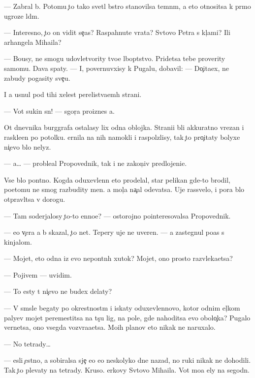 \documentclass[10pt]{book}
\begin{document}
— Zabral b{\yi}. Potomu {\c}to tako{\y} svetl{\yi}{\y} b{\yi}stro stanovilsa temn{\yi}m, a eto otnositsa k pr{\ia}mo{\y} ugroze l{\iu}d{\ia}m.

— Interesno, {\c}to on vidit se{\y}{\c}as? Raspahnut{\yi}{\y}e vrata? Sv{\ia}tovo Petra s kl{\iu}{\c}ami? Ili arhangela Miha{\y}ila?

— Bo{\y}usy, ne smogu udovletvority tvo{\y}e l{\iu}bop{\yi}tstvo. Pridetsa tebe proverity samomu. Dava{\y} spaty. — I, povernuvxisy k Pugalu, dobavil: — Do{\c}ita{\y}ex, ne zabudy pogasity sve{\c}u.

I {\y}a usnul pod tihi{\y} xelest perelist{\yi}va{\y}em{\yi}h strani{\q}.



— Vot sukin s{\yi}n! — sgor{\ia}{\c}a pro{\y}iznes {\y}a.

Ot dnevnika burggrafa ostalasy lix odna oblojka. Strani{\q}i b{\yi}li akkuratno v{\yi}rezan{\yi} i raskle{\y}en{\yi} po potolku. {\C}ernila na nih namokli i raspolzlisy, tak {\c}to pro{\c}itaty bolyxe ni{\c}evo b{\yi}lo nelyz{\ia}.

— {\Y}a… — proble{\y}al Propovednik, tak i ne zakon{\c}iv predlojeni{\y}e.

Vse b{\yi}lo pon{\ia}tno. Kogda oduxevlenn{\yi}{\y} eto prodelal, star{\yi}{\y} pelikan gde-to brodil, poetomu ne smog razbudity men{\ia}. {\Y}a mol{\c}a na{\c}al odevatsa. Uje rassvelo, i pora b{\yi}lo otpravl{\ia}tsa v dorogu.

— Tam soderjalosy {\c}to-to {\q}enno{\y}e? — ostorojno po{\y}interesovalsa Propovednik.

— {\Y}e{\x}o v{\c}era {\y}a b{\yi} skazal, {\c}to net. Tepery uje ne uveren. — {\Y}a zastegnul po{\y}as s kinjalom.

— Mojet, eto odna iz {\y}evo nepon{\ia}tn{\yi}h xutok? Mojet, ono prosto razvleka{\y}etsa?

— Pojivem — uvidim.

— To {\y}esty t{\yi} ni{\c}evo ne budex delaty?

— V sm{\yi}sle begaty po okrestnost{\ia}m i iskaty oduxevlennovo, kotor{\yi}{\y} odnim {\x}el{\c}kom paly{\q}ev mojet peremestitsa na t{\yi}s{\ia}{\c}u lig, na pole, gde nahoditsa {\y}evo obolo{\c}ka? Pugalo vernetsa, ono vsegda vozvra{\x}a{\y}etsa. Mo{\y}ih planov eto nikak ne naruxalo.

— No tetrady…

— {\Y}esli {\c}estno, {\y}a sobiralsa sje{\c} {\y}e{\y}o {\y}e{\x}o neskolyko dne{\y} nazad, no ruki nikak ne dohodili. Tak {\c}to plevaty na tetrady. Kruso. {\Q}erkovy Sv{\ia}tovo Miha{\y}ila. Vot mo{\y}a {\q}ely na segodn{\ia}.
\end{document}
